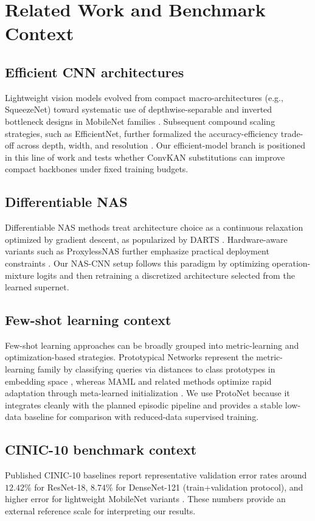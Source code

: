 \documentclass[cameraready]{Interspeech}
\begin{document}
\section{Related Work and Benchmark Context}
\subsection{Efficient CNN architectures}
Lightweight vision models evolved from compact macro-architectures (e.g., SqueezeNet) toward systematic use of depthwise-separable and inverted bottleneck designs in MobileNet families \cite{SqueezeNet,sandler2018mobilenetv2,Howard_2019_ICCV}. Subsequent compound scaling strategies, such as EfficientNet, further formalized the accuracy-efficiency trade-off across depth, width, and resolution \cite{tan2019efficientnet}. Our efficient-model branch is positioned in this line of work and tests whether ConvKAN substitutions can improve compact backbones under fixed training budgets.

\subsection{Differentiable NAS}
Differentiable NAS methods treat architecture choice as a continuous relaxation optimized by gradient descent, as popularized by DARTS \cite{liu2018darts}. Hardware-aware variants such as ProxylessNAS further emphasize practical deployment constraints \cite{cai2018proxylessnas}. Our NAS-CNN setup follows this paradigm by optimizing operation-mixture logits and then retraining a discretized architecture selected from the learned supernet.

\subsection{Few-shot learning context}
Few-shot learning approaches can be broadly grouped into metric-learning and optimization-based strategies. Prototypical Networks represent the metric-learning family by classifying queries via distances to class prototypes in embedding space \cite{NIPS2017_cb8da676}, whereas MAML and related methods optimize rapid adaptation through meta-learned initialization \cite{finn2017maml}. We use ProtoNet because it integrates cleanly with the planned episodic pipeline and provides a stable low-data baseline for comparison with reduced-data supervised training.

\subsection{CINIC-10 benchmark context}
Published CINIC-10 baselines report representative validation error rates around $12.42\%$ for ResNet-18, $8.74\%$ for DenseNet-121 (train+validation protocol), and higher error for lightweight MobileNet variants \cite{cinic}. These numbers provide an external reference scale for interpreting our results.
\end{document}
